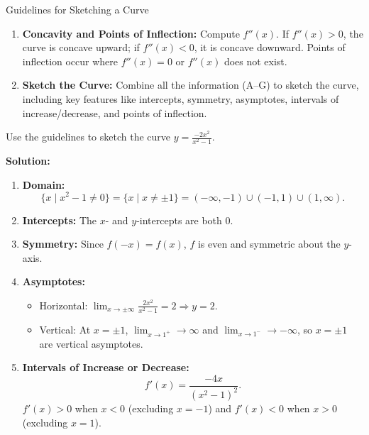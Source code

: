 \documentclass[12pt]{article}
\theoremstyle{beautifulthm}
\begin{document}
\begin{Note}{Guidelines for Sketching a Curve}
\begin{enumerate}
    \item \textbf{Concavity and Points of Inflection:} Compute \( f''(x) \). If \( f''(x) > 0 \), the curve is concave upward; if \( f''(x) < 0 \), it is concave downward. Points of inflection occur where \( f''(x) = 0 \) or \( f''(x) \) does not exist.

    \item \textbf{Sketch the Curve:} Combine all the information (A--G) to sketch the curve, including key features like intercepts, symmetry, asymptotes, intervals of increase/decrease, and points of inflection.
\end{enumerate}
\end{Note}


\begin{tcolorbox}[colback=examplebg, colframe=red!75!black, title=\textbf{EXAMPLE 1:Sketching the Curve}, fonttitle=\bfseries, sharp corners]
\noindent Use the guidelines to sketch the curve \( y = \frac{-2x^2}{x^2 - 1} \).

\tcblower
\textbf{Solution:} 
\begin{enumerate}
    \item \textbf{Domain:} 
    \[
    \{ x \mid x^2 - 1 \neq 0 \} = \{ x \mid x \neq \pm 1 \} = (-\infty, -1) \cup (-1, 1) \cup (1, \infty).
    \]

    \item \textbf{Intercepts:} 
    The \( x \)- and \( y \)-intercepts are both \( 0 \).

    \item \textbf{Symmetry:} 
    Since \( f(-x) = f(x) \), \( f \) is even and symmetric about the \( y \)-axis.

    \item \textbf{Asymptotes:}
    \begin{itemize}
        \item Horizontal: \( \lim_{x \to \pm \infty} \frac{2x^2}{x^2 - 1} = 2 \Rightarrow y = 2 \).
        \item Vertical: At \( x = \pm 1 \), \( \lim_{x \to 1^{+}} \to \infty \) and \( \lim_{x \to 1^{-}} \to -\infty \), so \( x = \pm 1 \) are vertical asymptotes.
    \end{itemize}

    \item \textbf{Intervals of Increase or Decrease:}
    \[
    f'(x) = \frac{-4x}{(x^2 - 1)^2}.
    \]
    \( f'(x) > 0 \) when \( x < 0 \) (excluding \( x = -1 \)) and \( f'(x) < 0 \) when \( x > 0 \) (excluding \( x = 1 \)).


\end{enumerate}
\end{tcolorbox}
\end{document}
